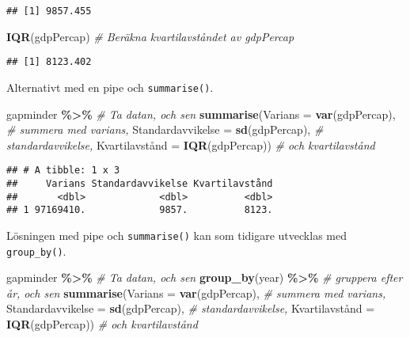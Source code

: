 \documentclass[
]{book}
\newenvironment{Shaded}{\begin{snugshade}}{\end{snugshade}}
\newcommand{\AttributeTok}[1]{\textcolor[rgb]{0.13,0.29,0.53}{#1}}
\newcommand{\CommentTok}[1]{\textcolor[rgb]{0.56,0.35,0.01}{\textit{#1}}}
\newcommand{\FunctionTok}[1]{\textcolor[rgb]{0.13,0.29,0.53}{\textbf{#1}}}
\newcommand{\NormalTok}[1]{#1}
\newcommand{\OtherTok}[1]{\textcolor[rgb]{0.56,0.35,0.01}{#1}}
\newcommand{\SpecialCharTok}[1]{\textcolor[rgb]{0.81,0.36,0.00}{\textbf{#1}}}
\theoremstyle{definition}
\theoremstyle{definition}
\theoremstyle{definition}
\theoremstyle{definition}
\theoremstyle{remark}
\begin{document}
\begin{verbatim}
## [1] 9857.455
\end{verbatim}

\begin{Shaded}
\begin{Highlighting}[]
\FunctionTok{IQR}\NormalTok{(gdpPercap)                                   }\CommentTok{\# Beräkna kvartilavståndet av gdpPercap}
\end{Highlighting}
\end{Shaded}

\begin{verbatim}
## [1] 8123.402
\end{verbatim}

Alternativt med en pipe och \texttt{summarise()}.

\begin{Shaded}
\begin{Highlighting}[]
\NormalTok{gapminder }\SpecialCharTok{\%\textgreater{}\%}                                    \CommentTok{\# Ta datan, och sen}
  \FunctionTok{summarise}\NormalTok{(}\AttributeTok{Varians =} \FunctionTok{var}\NormalTok{(gdpPercap),            }\CommentTok{\# summera med varians,}
            \AttributeTok{Standardavvikelse =} \FunctionTok{sd}\NormalTok{(gdpPercap),   }\CommentTok{\# standardavvikelse,}
\NormalTok{            Kvartilavstånd }\OtherTok{=} \FunctionTok{IQR}\NormalTok{(gdpPercap))     }\CommentTok{\# och kvartilavstånd}
\end{Highlighting}
\end{Shaded}

\begin{verbatim}
## # A tibble: 1 x 3
##     Varians Standardavvikelse Kvartilavstånd
##       <dbl>             <dbl>          <dbl>
## 1 97169410.             9857.          8123.
\end{verbatim}

Lösningen med pipe och \texttt{summarise()} kan som tidigare utvecklas med \texttt{group\_by()}.

\begin{Shaded}
\begin{Highlighting}[]
\NormalTok{gapminder }\SpecialCharTok{\%\textgreater{}\%}                                    \CommentTok{\# Ta datan, och sen}
  \FunctionTok{group\_by}\NormalTok{(year) }\SpecialCharTok{\%\textgreater{}\%}                             \CommentTok{\# gruppera efter år, och sen}
  \FunctionTok{summarise}\NormalTok{(}\AttributeTok{Varians =} \FunctionTok{var}\NormalTok{(gdpPercap),            }\CommentTok{\# summera med varians,}
            \AttributeTok{Standardavvikelse =} \FunctionTok{sd}\NormalTok{(gdpPercap),   }\CommentTok{\# standardavvikelse,}
\NormalTok{            Kvartilavstånd }\OtherTok{=} \FunctionTok{IQR}\NormalTok{(gdpPercap))     }\CommentTok{\# och kvartilavstånd}
\end{Highlighting}
\end{Shaded}
\end{document}
